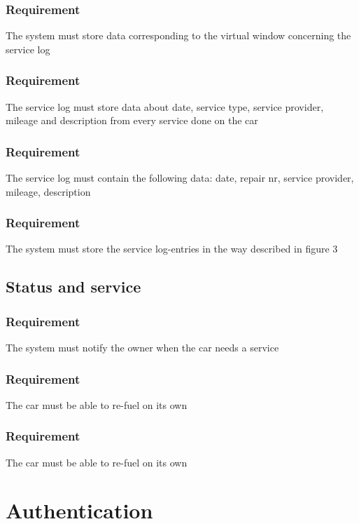 \documentclass{article}
\begin{document}
{      \subsubsection{Requirement}
\hfill \break 
\- \- \- The system must store data corresponding to the virtual window concerning the service log
      \subsubsection{Requirement}
\hfill \break 
\- \- \-The service log must store data about date, service type, service provider, mileage and description from every service done on the car
      \subsubsection{Requirement}
\hfill \break 
\- \- \-The service log must contain the following data: date, repair nr, service provider, mileage, description
      \subsubsection{Requirement}
\hfill \break 
\- \- \-The system must store the service log-entries in the way described in figure 3
  \subsection{Status and service}
      \subsubsection{Requirement}
\hfill \break 
\- \- \-The system must notify the owner when the car needs a service
      \subsubsection{Requirement}
\hfill \break 
\- \- \-The car must be able to re-fuel on its own
      \subsubsection{Requirement}
\hfill \break 
\- \- \-The car must be able to re-fuel on its own

\section{Authentication}
}
\end{document}

